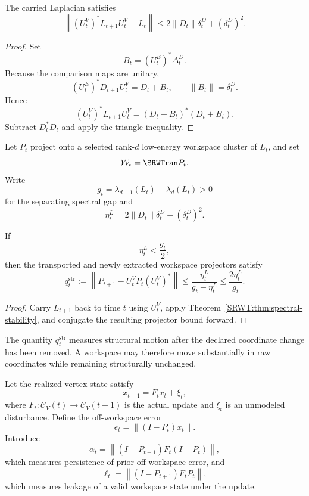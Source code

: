 \begin{SRWTproposition}\label{SRWT:prop:temporal-laplacian-drift}
The carried Laplacian satisfies
\[
\boxed{
\left\|
(U_t^V)^*L_{t+1}U_t^V-L_t
\right\|
\leq
2\|D_t\|\delta_t^D+(\delta_t^D)^2.
}
\]
\end{SRWTproposition}

\begin{proof}
Set
\[
B_t=(U_t^E)^*\Delta_t^D.
\]
Because the comparison maps are unitary,
\[
(U_t^E)^*D_{t+1}U_t^V=D_t+B_t,
\qquad
\|B_t\|=\delta_t^D.
\]
Hence
\[
(U_t^V)^*L_{t+1}U_t^V
=(D_t+B_t)^*(D_t+B_t).
\]
Subtract \(D_t^*D_t\) and apply the triangle inequality.
\end{proof}

Let \(P_t\) project onto a selected rank-\(d\) low-energy workspace cluster
of \(L_t\), and set
\[
\mathcal W_t=\SRWTran P_t.
\]
Write
\[
g_t=\lambda_{d+1}(L_t)-\lambda_d(L_t)>0
\]
for the separating spectral gap and
\[
\eta_t^L=2\|D_t\|\delta_t^D+(\delta_t^D)^2.
\]

\begin{SRWTcorollary}\label{SRWT:cor:temporal-workspace-tracking}
If
\[
\eta_t^L<\frac{g_t}{2},
\]
then the transported and newly extracted workspace projectors satisfy
\[
\boxed{
q_t^{\mathrm{str}}
:=
\left\|
P_{t+1}-U_t^VP_t(U_t^V)^*
\right\|
\leq
\frac{\eta_t^L}{g_t-\eta_t^L}
\leq
\frac{2\eta_t^L}{g_t}.
}
\]
\end{SRWTcorollary}

\begin{proof}
Carry \(L_{t+1}\) back to time \(t\) using \(U_t^V\), apply
Theorem~\ref{SRWT:thm:spectral-stability}, and conjugate the resulting projector
bound forward.
\end{proof}

The quantity \(q_t^{\mathrm{str}}\) measures structural motion after the
declared coordinate change has been removed. A workspace may therefore move
substantially in raw coordinates while remaining structurally unchanged.


Let the realized vertex state satisfy
\[
x_{t+1}=F_tx_t+\xi_t,
\]
where \(F_t:\mathcal C_V(t)\to\mathcal C_V(t+1)\) is the actual update and
\(\xi_t\) is an unmodeled disturbance. Define the off-workspace error
\[
\boxed{
e_t=\|(I-P_t)x_t\|.
}
\]
Introduce
\[
\alpha_t
=
\left\|
(I-P_{t+1})F_t(I-P_t)
\right\|,
\]
which measures persistence of prior off-workspace error, and
\[
\ell_t
=
\left\|
(I-P_{t+1})F_tP_t
\right\|,
\]
which measures leakage of a valid workspace state under the update.

